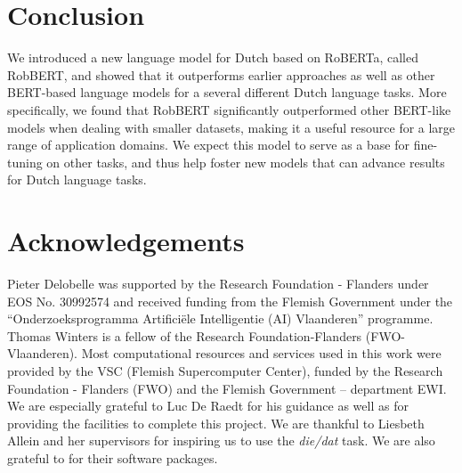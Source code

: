 \documentclass[11pt,a4paper]{article}
\begin{document}
\section{Conclusion}



We introduced a new language model for Dutch based on RoBERTa, called RobBERT, and showed that it outperforms earlier approaches as well as other BERT-based language models for a several different Dutch language tasks.
More specifically, we found that RobBERT significantly outperformed other BERT-like models when dealing with smaller datasets, making it a useful resource for a large range of application domains.
We expect this model to serve as a base for fine-tuning on other tasks, and thus help foster new models that can advance results for Dutch language tasks.

\section*{Acknowledgements}

Pieter Delobelle was supported by the Research Foundation - Flanders under EOS No. 30992574 and received funding from the Flemish Government under the “Onderzoeksprogramma Artificiële Intelligentie (AI) Vlaanderen” programme.
Thomas Winters is a fellow of the Research Foundation-Flanders (FWO-Vlaanderen).
Most computational resources and services used in this work were provided by the VSC (Flemish Supercomputer Center), funded by the Research Foundation - Flanders (FWO) and the Flemish Government – department EWI.
We are especially grateful to Luc De Raedt for his guidance as well as for providing the facilities to complete this project.
We are thankful to Liesbeth Allein and her supervisors for inspiring us to use the \textit{die/dat} task.
We are also grateful to \citet{ott2019fairseq, paszke2019pytorch, Haghighi2018, wolfHuggingFace2019} for their software packages.



 

\end{document}
